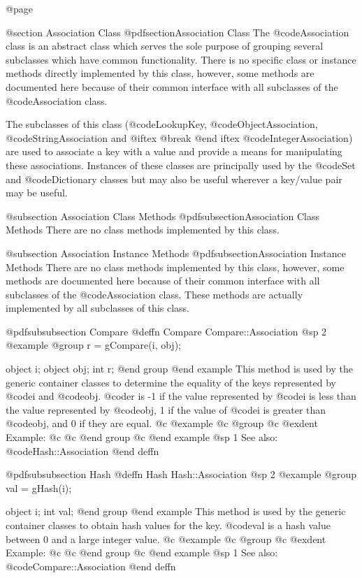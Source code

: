 @page

@section  Association Class
@pdfsection{Association Class}
The @code{Association} class is an abstract class which serves the
sole purpose of grouping several subclasses which have common
functionality.  There is no specific class or instance methods
directly implemented by this class, however, some methods are documented
here because of their common interface with all subclasses of the
@code{Association} class.

The subclasses of this class (@code{LookupKey},
@code{ObjectAssociation}, @code{StringAssociation} and
@iftex @break @end iftex
@code{IntegerAssociation}) are used to associate a key with a value and
provide a means for manipulating these associations.  Instances of these
classes are principally used by the @code{Set} and @code{Dictionary}
classes but may also be useful wherever a key/value pair may be useful.


@subsection Association Class Methods
@pdfsubsection{Association Class Methods}
There are no class methods implemented by this class.


@subsection Association Instance Methods
@pdfsubsection{Association Instance Methods}
There are no class methods implemented by this class, however, some
methods are documented here because of their common interface with all
subclasses of the @code{Association} class.  These methods are actually
implemented by all subclasses of this class.






@pdfsubsubsection {Compare}
@deffn {Compare} Compare::Association
@sp 2
@example
@group
r = gCompare(i, obj);

object  i;
object  obj;
int     r;
@end group
@end example
This method is used by the generic container classes to determine
the equality of the keys represented by @code{i} and @code{obj}. 
@code{r} is -1 if the value represented by @code{i} is less than
the value represented by @code{obj}, 1 if the value of @code{i}
is greater than @code{obj}, and 0 if they are equal.
@c @example
@c @group
@c @exdent Example:
@c
@c @end group
@c @end example
@sp 1
See also:  @code{Hash::Association}
@end deffn










@pdfsubsubsection {Hash}
@deffn {Hash} Hash::Association
@sp 2
@example
@group
val = gHash(i);

object  i;
int     val;
@end group
@end example
This method is used by the generic container classes to obtain hash
values for the key.  @code{val} is a hash value between 0 and a large
integer value.
@c @example
@c @group
@c @exdent Example:
@c
@c @end group
@c @end example
@sp 1
See also:  @code{Compare::Association}
@end deffn












